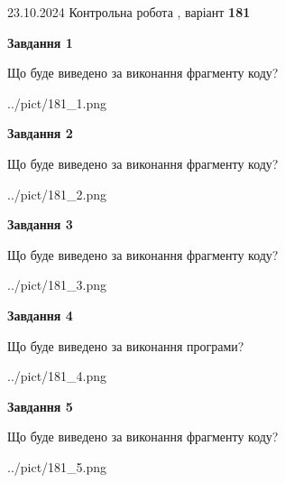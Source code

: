 \documentclass[12pt, ukrainian]{article}
\begin{document}
{\Large{23.10.2024 Контрольна робота , варіант  \No \textbf { 181 }\par}}
{
\begin {large}
{\begin {center}\textbf{Завдання 1}\end {center}}

Що буде виведено за виконання фрагменту коду?\par
\begin{center}
	{../pict/181_1.png}
\end{center}
\newpage

{\begin {center}\textbf{Завдання 2}\end {center}}

Що буде виведено за виконання фрагменту коду?\par
\begin{center}
	{../pict/181_2.png}
\end{center}
\newpage

{\begin {center}\textbf{Завдання 3}\end {center}}

Що буде виведено за виконання фрагменту коду?\par
\begin{center}
	{../pict/181_3.png}
\end{center}
\newpage

{\begin {center}\textbf{Завдання 4}\end {center}}

Що буде виведено за виконання програми?\par
\begin{center}
	{../pict/181_4.png}
\end{center}
\newpage

{\begin {center}\textbf{Завдання 5}\end {center}}

Що буде виведено за виконання фрагменту коду?\par
\begin{center}
	{../pict/181_5.png}
\end{center}
\newpage


\end{large}}
\end{document}
